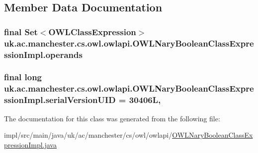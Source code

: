 \subsection{Member Data Documentation}
\hypertarget{classuk_1_1ac_1_1manchester_1_1cs_1_1owl_1_1owlapi_1_1_o_w_l_nary_boolean_class_expression_impl_af6e58b4bd9107f35125d03637c9dcb0f}{
\subsubsection[{operands}]{\setlength{\rightskip}{0pt plus 5cm}final Set$<${\bf O\-W\-L\-Class\-Expression}$>$ uk.\-ac.\-manchester.\-cs.\-owl.\-owlapi.\-O\-W\-L\-Nary\-Boolean\-Class\-Expression\-Impl.\-operands\hspace{0.3cm}{\ttfamily [private]}}}\label{classuk_1_1ac_1_1manchester_1_1cs_1_1owl_1_1owlapi_1_1_o_w_l_nary_boolean_class_expression_impl_af6e58b4bd9107f35125d03637c9dcb0f}
\hypertarget{classuk_1_1ac_1_1manchester_1_1cs_1_1owl_1_1owlapi_1_1_o_w_l_nary_boolean_class_expression_impl_aa5016a816c9c4304b95603c752a84c00}{
\subsubsection[{serial\-Version\-U\-I\-D}]{\setlength{\rightskip}{0pt plus 5cm}final long uk.\-ac.\-manchester.\-cs.\-owl.\-owlapi.\-O\-W\-L\-Nary\-Boolean\-Class\-Expression\-Impl.\-serial\-Version\-U\-I\-D = 30406\-L\hspace{0.3cm}{\ttfamily [static]}, {\ttfamily [private]}}}\label{classuk_1_1ac_1_1manchester_1_1cs_1_1owl_1_1owlapi_1_1_o_w_l_nary_boolean_class_expression_impl_aa5016a816c9c4304b95603c752a84c00}


The documentation for this class was generated from the following file\-:\begin{DoxyCompactItemize}
\item 
impl/src/main/java/uk/ac/manchester/cs/owl/owlapi/\hyperlink{_o_w_l_nary_boolean_class_expression_impl_8java}{O\-W\-L\-Nary\-Boolean\-Class\-Expression\-Impl.\-java}\end{DoxyCompactItemize}
